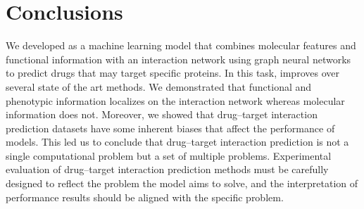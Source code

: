 \documentclass{bioinfo}
\begin{document}















\section{Conclusions}

We developed \name{} as a machine learning model that combines
molecular features and functional information with an interaction
network using graph neural networks to predict drugs that may target
specific proteins. In this task, \name{} improves over several state
of the art methods. We demonstrated that functional and phenotypic
information localizes on the interaction network whereas molecular
information does not. Moreover, we showed that drug--target
interaction prediction datasets have some inherent biases that affect
the performance of models. This led us to conclude that drug--target
interaction prediction is not a single computational problem but a set
of multiple problems. Experimental evaluation of drug--target
interaction prediction methods must be carefully designed to reflect
the problem the model aims to solve, and the interpretation of
performance results should be aligned with the specific problem.
\end{document}
